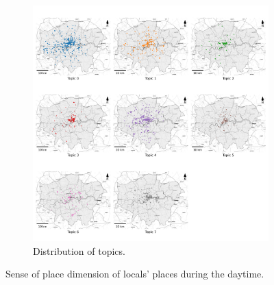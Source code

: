 \documentclass{article}
\theoremstyle{remark}
\begin{document}
\begin{figure}[!h]
    \begin{subfigure}{0.9\textwidth}
        \centering
        \includegraphics[width=\linewidth]{figures/topics_distribution_daytime_locals.png} 
        \caption{Distribution of topics.}
        \label{fig:topics_distribution_daytime_locals}
    \end{subfigure}

    \caption{Sense of place dimension of locals' places during the daytime.}
    \label{fig:places_topics_sense_locals_daytime}
\end{figure}
\end{document}
